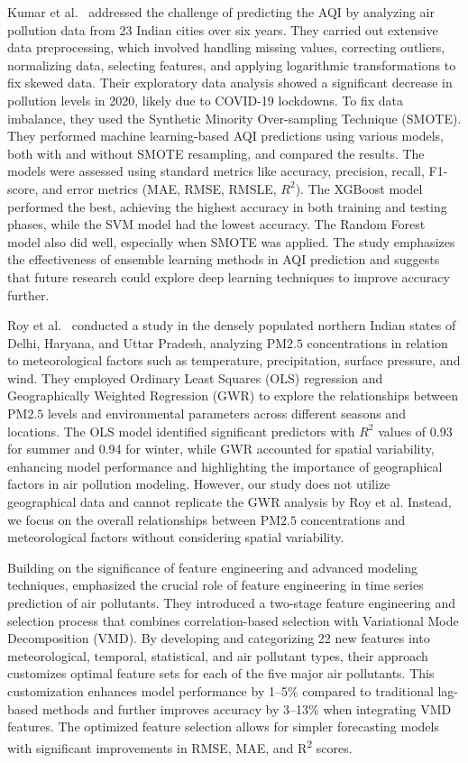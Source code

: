 \documentclass[twoside,11pt]{article}
\begin{document}
Kumar et al.\ \citep{Kumar2023} addressed the challenge of predicting the AQI by analyzing air pollution data from 23 Indian cities over six years. They carried out extensive data preprocessing, which involved handling missing values, correcting outliers, normalizing data, selecting features, and applying logarithmic transformations to fix skewed data. Their exploratory data analysis showed a significant decrease in pollution levels in 2020, likely due to COVID-19 lockdowns. To fix data imbalance, they used the Synthetic Minority Over-sampling Technique (SMOTE). They performed machine learning-based AQI predictions using various models, both with and without SMOTE resampling, and compared the results. The models were assessed using standard metrics like accuracy, precision, recall, F1-score, and error metrics (MAE, RMSE, RMSLE, $R^2$). The XGBoost model performed the best, achieving the highest accuracy in both training and testing phases, while the SVM model had the lowest accuracy. The Random Forest model also did well, especially when SMOTE was applied. The study emphasizes the effectiveness of ensemble learning methods in AQI prediction and suggests that future research could explore deep learning techniques to improve accuracy further.

Roy et al.\ \citep{ROY20244106} conducted a study in the densely populated northern Indian states of Delhi, Haryana, and Uttar Pradesh, analyzing PM${2.5}$ concentrations in relation to meteorological factors such as temperature, precipitation, surface pressure, and wind. They employed Ordinary Least Squares (OLS) regression and Geographically Weighted Regression (GWR) to explore the relationships between PM${2.5}$ levels and environmental parameters across different seasons and locations. The OLS model identified significant predictors with $R^2$ values of 0.93 for summer and 0.94 for winter, while GWR accounted for spatial variability, enhancing model performance and highlighting the importance of geographical factors in air pollution modeling. However, our study does not utilize geographical data and cannot replicate the GWR analysis by Roy et al. Instead, we focus on the overall relationships between PM${2.5}$ concentrations and meteorological factors without considering spatial variability.

Building on the significance of feature engineering and advanced modeling techniques, \citep{naz2024twostage} emphasized the crucial role of feature engineering in time series prediction of air pollutants. They introduced a two-stage feature engineering and selection process that combines correlation-based selection with Variational Mode Decomposition (VMD). By developing and categorizing 22 new features into meteorological, temporal, statistical, and air pollutant types, their approach customizes optimal feature sets for each of the five major air pollutants. This customization enhances model performance by 1–5\% compared to traditional lag-based methods and further improves accuracy by 3–13\% when integrating VMD features. The optimized feature selection allows for simpler forecasting models with significant improvements in RMSE, MAE, and R\textsuperscript{2} scores.
\end{document}
